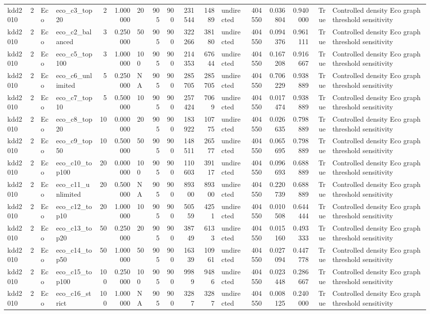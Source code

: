 \begin{tabular}{lrllrrlrrrrlrrrrl}
kdd2010 & 2 & Eco & eco_c3_top20 & 2 & 1.000000 & 20 & 905 & 900 & 231544 & 14889 & undirected & 404550 & 0.036804 & 0.940000 & True & Controlled density Eco graph threshold sensitivity \\
kdd2010 & 2 & Eco & eco_c2_balanced & 3 & 0.250000 & 50 & 905 & 900 & 322266 & 38180 & undirected & 404550 & 0.094376 & 0.961111 & True & Controlled density Eco graph threshold sensitivity \\
kdd2010 & 2 & Eco & eco_c5_top100 & 3 & 1.000000 & 100 & 905 & 900 & 214353 & 67644 & undirected & 404550 & 0.167208 & 0.916667 & True & Controlled density Eco graph threshold sensitivity \\
kdd2010 & 2 & Eco & eco_c6_unlimited & 5 & 0.250000 & NA & 905 & 900 & 285705 & 285705 & undirected & 404550 & 0.706229 & 0.938889 & True & Controlled density Eco graph threshold sensitivity \\
kdd2010 & 2 & Eco & eco_c7_top10 & 5 & 0.500000 & 10 & 905 & 900 & 257424 & 7069 & undirected & 404550 & 0.017474 & 0.938889 & True & Controlled density Eco graph threshold sensitivity \\
kdd2010 & 2 & Eco & eco_c8_top20 & 10 & 0.000000 & 20 & 905 & 900 & 183922 & 10775 & undirected & 404550 & 0.026635 & 0.798889 & True & Controlled density Eco graph threshold sensitivity \\
kdd2010 & 2 & Eco & eco_c9_top50 & 10 & 0.500000 & 50 & 905 & 900 & 148511 & 26577 & undirected & 404550 & 0.065695 & 0.798889 & True & Controlled density Eco graph threshold sensitivity \\
kdd2010 & 2 & Eco & eco_c10_top100 & 20 & 0.000000 & 100 & 905 & 900 & 110603 & 39117 & undirected & 404550 & 0.096693 & 0.688889 & True & Controlled density Eco graph threshold sensitivity \\
kdd2010 & 2 & Eco & eco_c11_unlimited & 20 & 0.500000 & NA & 905 & 900 & 89300 & 89300 & undirected & 404550 & 0.220739 & 0.688889 & True & Controlled density Eco graph threshold sensitivity \\
kdd2010 & 2 & Eco & eco_c12_top10 & 20 & 1.000000 & 10 & 905 & 900 & 50559 & 4251 & undirected & 404550 & 0.010508 & 0.644444 & True & Controlled density Eco graph threshold sensitivity \\
kdd2010 & 2 & Eco & eco_c13_top20 & 50 & 0.250000 & 20 & 905 & 900 & 38749 & 6133 & undirected & 404550 & 0.015160 & 0.493333 & True & Controlled density Eco graph threshold sensitivity \\
kdd2010 & 2 & Eco & eco_c14_top50 & 50 & 1.000000 & 50 & 905 & 900 & 16339 & 10961 & undirected & 404550 & 0.027094 & 0.447778 & True & Controlled density Eco graph threshold sensitivity \\
kdd2010 & 2 & Eco & eco_c15_top100 & 100 & 0.250000 & 100 & 905 & 900 & 9989 & 9486 & undirected & 404550 & 0.023448 & 0.286667 & True & Controlled density Eco graph threshold sensitivity \\
kdd2010 & 2 & Eco & eco_c16_strict & 100 & 1.000000 & NA & 905 & 900 & 3287 & 3287 & undirected & 404550 & 0.008125 & 0.240000 & True & Controlled density Eco graph threshold sensitivity \\
\bottomrule
\end{tabular}
